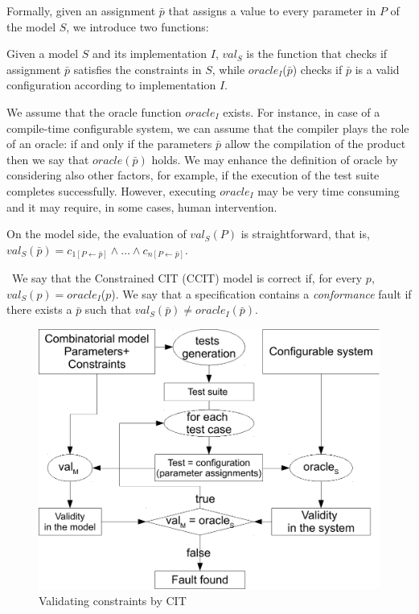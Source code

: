 \begin{tikzborder}{\cite{Gargantini16:validation}}
	Formally, given an assignment $\bar{p}$ that assigns a value to every parameter in $P$ of the model $S$,
	we introduce two functions:
	\begin{defn}
		Given a model $S$ and its implementation $I$, $val_{S}$ is the function
		that checks if assignment $\bar{p}$ satisfies the constraints in $S$, while
		$oracle_{I}$($\bar{p}$) checks if $\bar{p}$ is a valid configuration according to 
		implementation $I$.
	\end{defn}
	We assume that the oracle function $oracle_{I}$ exists. For instance, in case of a compile-time configurable system, we can assume that the compiler plays the role of an oracle: if and only if the parameters $\bar{p}$ allow the compilation of the product then we say that   $oracle({\bar{p}})$ holds. We may enhance the definition of oracle by considering also other factors, for example, if the execution of the test suite completes successfully. However, executing  $oracle_{I}$ may be very time consuming and it may require, in some cases,  human intervention.
	
	On the model side, the evaluation of  $val_{S}(P)$ is straightforward, that is, $val_{S}(\bar{p})=c_{1[P\leftarrow\bar{p}]}\wedge \ldots\wedge c_{n[P\leftarrow\bar{p}]}$.
	
	\begin{defn}\
		\label{def:validation_correctness}We say that the Constrained CIT (CCIT) model is correct if, for
		every $p$, $val_{S}(p)=oracle_{I}$($p$). We say that a specification
		contains a \emph{conformance} fault if there exists a $\bar{p}$ such that $val_{S}(\bar{p})\neq oracle_I(\bar{p})$.
	\end{defn}
	\be
	
	\begin{figure}[h]
		\begin{center}
			\includegraphics[width=.65\columnwidth]{images/spec_vs_impl}
		\end{center}
		\caption{Validating constraints by CIT}\label{fig:process}
	\end{figure}
	

\end{tikzborder}
